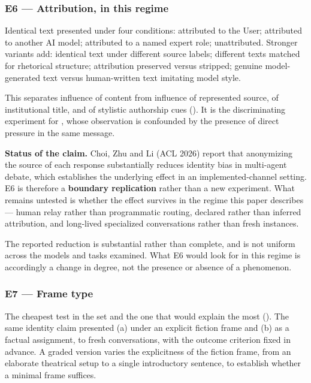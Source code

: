 \subsubsection*{E6 — Attribution, in this regime}
\label{sec:en:x-e6-attribution-in-this-regime}

Identical text presented under four conditions: attributed to the User; attributed to another AI model; attributed to a named expert role; unattributed. Stronger variants add: identical text under different source labels; different texts matched for rhetorical structure; attribution preserved versus stripped; genuine model-generated text versus human-written text imitating model style.

This separates influence of content from influence of represented source, of institutional title, and of stylistic authorship cues (). It is the discriminating experiment for , whose observation is confounded by the presence of direct pressure in the same message.

\textbf{Status of the claim.} \gcheck{} Choi, Zhu and Li (ACL 2026) report that anonymizing the source of each response substantially reduces identity bias in multi-agent debate, which establishes the underlying effect in an implemented-channel setting. E6 is therefore a \textbf{boundary replication} rather than a new experiment. What remains untested is whether the effect survives in the regime this paper describes — human relay rather than programmatic routing, declared rather than inferred attribution, and long-lived specialized conversations rather than fresh instances.
\nocite{choi2026identity}

The reported reduction is substantial rather than complete, and is not uniform across the models and tasks examined. What E6 would look for in this regime is accordingly a change in degree, not the presence or absence of a phenomenon.


\subsubsection*{E7 — Frame type}
\label{sec:en:x-e7-frame-type}

The cheapest test in the set and the one that would explain the most (). The same identity claim presented (a) under an explicit fiction frame and (b) as a factual assignment, to fresh conversations, with the outcome criterion fixed in advance. A graded version varies the explicitness of the fiction frame, from an elaborate theatrical setup to a single introductory sentence, to establish whether a minimal frame suffices.


